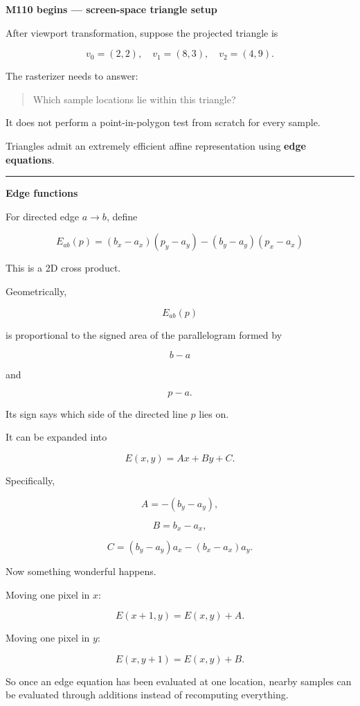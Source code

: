 \textbf{M110 begins --- screen-space triangle setup}

After viewport transformation, suppose the projected triangle is

\[
v_0=(2,2),\quad
v_1=(8,3),\quad
v_2=(4,9).
\]

The rasterizer needs to answer:

\begin{quote}
Which sample locations lie within this triangle?
\end{quote}

It does not perform a point-in-polygon test from scratch for every sample.

Triangles admit an extremely efficient affine representation using \textbf{edge equations}.

\begin{center}\rule{0.5\linewidth}{0.5pt}\end{center}

\textbf{Edge functions}

For directed edge \(a\rightarrow b\), define

\[
\boxed{
E_{ab}(p)
=
(b_x-a_x)(p_y-a_y)
-
(b_y-a_y)(p_x-a_x)
}
\]

This is a 2D cross product.

Geometrically,

\[
E_{ab}(p)
\]

is proportional to the signed area of the parallelogram formed by

\[
b-a
\]

and

\[
p-a.
\]

Its sign says which side of the directed line \(p\) lies on.

It can be expanded into

\[
E(x,y)=Ax+By+C.
\]

Specifically,

\[
A=-(b_y-a_y),
\]

\[
B=b_x-a_x,
\]

\[
C=(b_y-a_y)a_x-(b_x-a_x)a_y.
\]

Now something wonderful happens.

Moving one pixel in \(x\):

\[
E(x+1,y)=E(x,y)+A.
\]

Moving one pixel in \(y\):

\[
E(x,y+1)=E(x,y)+B.
\]

So once an edge equation has been evaluated at one location, nearby samples can be evaluated through additions instead of recomputing everything.

